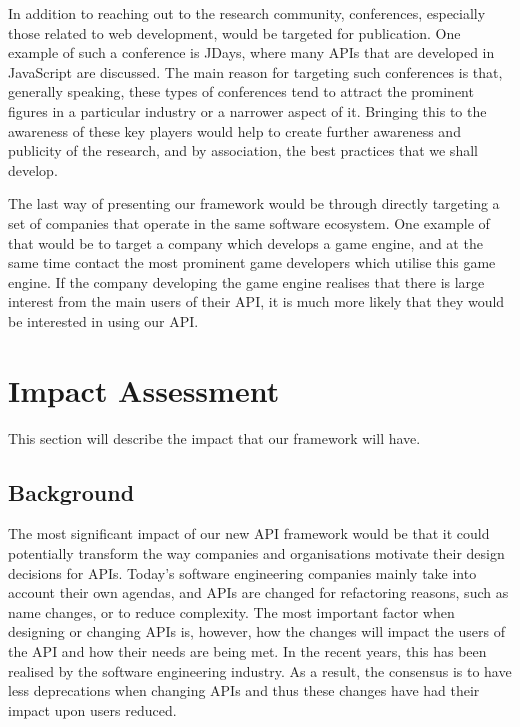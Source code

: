 \documentclass{article}
\begin{document}
In addition to reaching out to the research community, conferences, especially those related to web development, would be targeted for publication. One example of such a conference is JDays, where many APIs that are developed in JavaScript are discussed. The main reason for targeting such conferences is that, generally speaking, these types of conferences tend to attract the prominent figures in a particular industry or a narrower aspect of it. Bringing this to the awareness of these key players would help to create further awareness and publicity of the research, and by association, the best practices that we shall develop.

The last way of presenting our framework would be through directly targeting a set of companies that operate in the same software ecosystem. One example of that would be to target a company which develops a game engine, and at the same time contact the most prominent game developers which utilise this game engine. If the company developing the game engine realises that there is large interest from the main users of their API, it is much more likely that they would be interested in using our API. 


\section{Impact Assessment}
This section will describe the impact that our framework will have. 

\subsection{Background}
The most significant impact of our new API framework would be that it could potentially transform the way companies and organisations motivate their design decisions for APIs. Today's software engineering companies mainly take into account their own agendas, and APIs are changed for refactoring reasons, such as name changes, or to reduce complexity. The most important factor when designing or changing APIs is, however, how the changes will impact the users of the API and how their needs are being met. In the recent years, this has been realised by the software engineering industry. As a result, the consensus is to have less deprecations when changing APIs and thus these changes have had their impact upon users reduced. 
\end{document}
